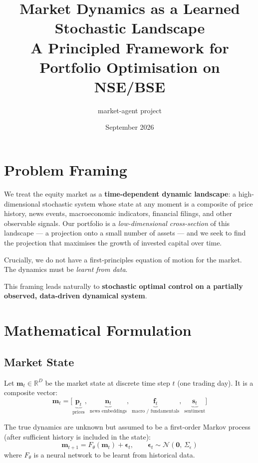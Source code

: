 \documentclass[11pt, a4paper]{article}
\title{\textbf{Market Dynamics as a Learned Stochastic Landscape} \\
       \large A Principled Framework for Portfolio Optimisation on NSE/BSE}
\author{market-agent project}
\date{September 2026}
\begin{document}
\maketitle
\tableofcontents
\newpage

\section{Problem Framing}

We treat the equity market as a \textbf{time-dependent dynamic landscape}: a
high-dimensional stochastic system whose state at any moment is a composite of
price history, news events, macroeconomic indicators, financial filings, and
other observable signals.  Our portfolio is a \emph{low-dimensional
cross-section} of this landscape — a projection onto a small number of assets —
and we seek to find the projection that maximises the growth of invested capital
over time.

Crucially, we do not have a first-principles equation of motion for the market.
The dynamics must be \emph{learnt from data}.

This framing leads naturally to \textbf{stochastic optimal control on a
partially observed, data-driven dynamical system}.

\section{Mathematical Formulation}

\subsection{Market State}

Let $\mathbf{m}_t \in \mathbb{R}^D$ be the market state at discrete time step $t$
(one trading day).  It is a composite vector:
\[
  \mathbf{m}_t = \bigl[\underbrace{\mathbf{p}_t}_{\text{prices}},\;
                        \underbrace{\mathbf{n}_t}_{\text{news embeddings}},\;
                        \underbrace{\mathbf{f}_t}_{\text{macro / fundamentals}},\;
                        \underbrace{\mathbf{s}_t}_{\text{sentiment}}\bigr]
\]

The true dynamics are unknown but assumed to be a first-order Markov process
(after sufficient history is included in the state):
\begin{equation}\label{eq:dynamics}
  \mathbf{m}_{t+1} = F_\theta(\mathbf{m}_t) + \boldsymbol{\epsilon}_t,
  \qquad \boldsymbol{\epsilon}_t \sim \mathcal{N}(\mathbf{0},\, \Sigma_\epsilon)
\end{equation}
where $F_\theta$ is a neural network to be learnt from historical data.
\end{document}
